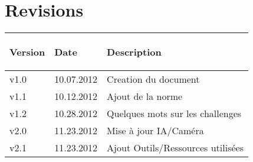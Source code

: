 \part*{Revisions}

%
%

\begin{tabular}{|p{2cm}|p{2cm}|p{6cm}|}
	\hline
		\rowcolor{table_header_color} 
		\begin{bf}Version\end{bf} & \begin{bf}Date\end{bf} & \begin{bf}Description\end{bf} \\
	\hline
		v1.0 & 10.07.2012 & Creation du document \\
	\hline
		v1.1 & 10.12.2012 & Ajout de la norme \\
	\hline
		v1.2 & 10.28.2012 & Quelques mots sur les challenges \\
	\hline
		v2.0 & 11.23.2012 & Mise à jour IA/Caméra \\
	\hline
		v2.1 & 11.23.2012 & Ajout Outils/Ressources utilisées \\
	\hline
\end{tabular}